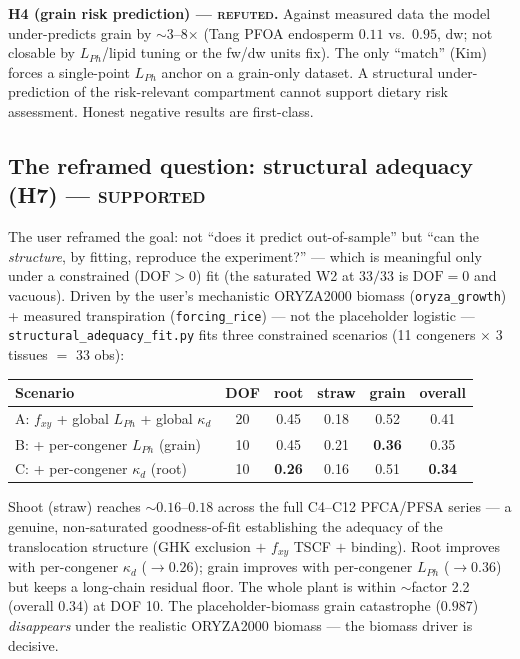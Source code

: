\documentclass[11pt]{article}
\begin{document}
\textbf{H4 (grain risk prediction) --- \textsc{refuted}.} Against
measured data the model under-predicts grain by $\sim$3--8$\times$
(Tang PFOA endosperm $0.11$ vs.\ $0.95$, dw; not closable by
$L_{Ph}$/lipid tuning or the fw/dw units fix). The only ``match''
(Kim) forces a single-point $L_{Ph}$ anchor on a grain-only dataset. A
structural under-prediction of the risk-relevant compartment cannot
support dietary risk assessment. Honest negative results are
first-class.

\subsection{The reframed question: structural adequacy (H7) ---
\textsc{supported}}

The user reframed the goal: not ``does it predict out-of-sample'' but
``can the \emph{structure}, by fitting, reproduce the experiment?'' ---
which is meaningful only under a constrained ($\mathrm{DOF}>0$) fit
(the saturated W2 at $33/33$ is $\mathrm{DOF}=0$ and vacuous). Driven
by the user's mechanistic ORYZA2000 biomass (\texttt{oryza\_growth}) +
measured transpiration (\texttt{forcing\_rice}) --- not the placeholder
logistic --- \texttt{structural\_adequacy\_fit.py} fits three
constrained scenarios (11 congeners $\times$ 3 tissues $=$ 33 obs):

\begin{center}
\begin{tabular}{l c c c c c}
\toprule
Scenario & DOF & root & straw & grain & overall \\
\midrule
A: $f_{xy}$ + global $L_{Ph}$ + global $\kappa_d$ & 20 & 0.45 & 0.18 & 0.52 & 0.41 \\
B: + per-congener $L_{Ph}$ (grain)               & 10 & 0.45 & 0.21 & \textbf{0.36} & 0.35 \\
C: + per-congener $\kappa_d$ (root)              & 10 & \textbf{0.26} & 0.16 & 0.51 & \textbf{0.34} \\
\bottomrule
\end{tabular}
\end{center}

Shoot (straw) reaches $\sim 0.16$--$0.18$ across the full C4--C12
PFCA/PFSA series --- a genuine, non-saturated goodness-of-fit
establishing the adequacy of the translocation structure (GHK
exclusion $+$ $f_{xy}$ TSCF $+$ binding). Root improves with
per-congener $\kappa_d$ ($\to 0.26$); grain improves with per-congener
$L_{Ph}$ ($\to 0.36$) but keeps a long-chain residual floor. The whole
plant is within $\sim$factor 2.2 (overall $0.34$) at DOF 10. The
placeholder-biomass grain catastrophe ($0.987$) \emph{disappears}
under the realistic ORYZA2000 biomass --- the biomass driver is
decisive.
\end{document}
